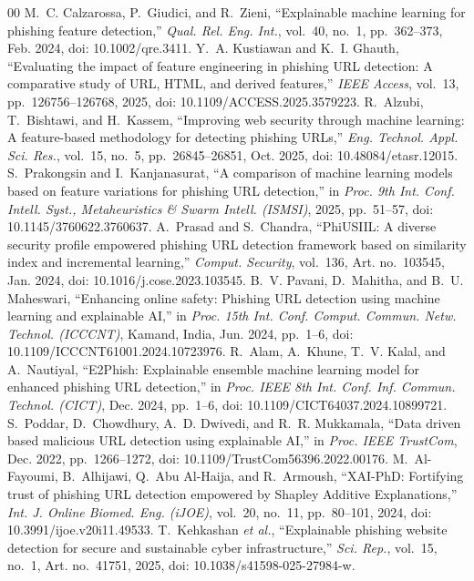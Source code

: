 \documentclass[conference]{IEEEtran}
\begin{document}
\begin{thebibliography}{00}
 M.~C. Calzarossa, P.~Giudici, and R.~Zieni, ``Explainable machine learning for phishing feature detection,'' \textit{Qual. Rel. Eng. Int.}, vol.~40, no.~1, pp.~362--373, Feb. 2024, doi: 10.1002/qre.3411.
 Y.~A. Kustiawan and K.~I. Ghauth, ``Evaluating the impact of feature engineering in phishing URL detection: A comparative study of URL, HTML, and derived features,'' \textit{IEEE Access}, vol.~13, pp.~126756--126768, 2025, doi: 10.1109/ACCESS.2025.3579223.
 R.~Alzubi, T.~Bishtawi, and H.~Kassem, ``Improving web security through machine learning: A feature-based methodology for detecting phishing URLs,'' \textit{Eng. Technol. Appl. Sci. Res.}, vol.~15, no.~5, pp.~26845--26851, Oct. 2025, doi: 10.48084/etasr.12015.
 S.~Prakongsin and I.~Kanjanasurat, ``A comparison of machine learning models based on feature variations for phishing URL detection,'' in \textit{Proc. 9th Int. Conf. Intell. Syst., Metaheuristics \& Swarm Intell. (ISMSI)}, 2025, pp.~51--57, doi: 10.1145/3760622.3760637.
 A.~Prasad and S.~Chandra, ``PhiUSIIL: A diverse security profile empowered phishing URL detection framework based on similarity index and incremental learning,'' \textit{Comput. Security}, vol.~136, Art. no.~103545, Jan. 2024, doi: 10.1016/j.cose.2023.103545.
 B.~V. Pavani, D.~Mahitha, and B.~U. Maheswari, ``Enhancing online safety: Phishing URL detection using machine learning and explainable AI,'' in \textit{Proc. 15th Int. Conf. Comput. Commun. Netw. Technol. (ICCCNT)}, Kamand, India, Jun. 2024, pp.~1--6, doi: 10.1109/ICCCNT61001.2024.10723976.
 R.~Alam, A.~Khune, T.~V. Kalal, and A.~Nautiyal, ``E2Phish: Explainable ensemble machine learning model for enhanced phishing URL detection,'' in \textit{Proc. IEEE 8th Int. Conf. Inf. Commun. Technol. (CICT)}, Dec. 2024, pp.~1--6, doi: 10.1109/CICT64037.2024.10899721.
 S.~Poddar, D.~Chowdhury, A.~D. Dwivedi, and R.~R. Mukkamala, ``Data driven based malicious URL detection using explainable AI,'' in \textit{Proc. IEEE TrustCom}, Dec. 2022, pp.~1266--1272, doi: 10.1109/TrustCom56396.2022.00176.
 M.~Al-Fayoumi, B.~Alhijawi, Q.~Abu Al-Haija, and R.~Armoush, ``XAI-PhD: Fortifying trust of phishing URL detection empowered by Shapley Additive Explanations,'' \textit{Int. J. Online Biomed. Eng. (iJOE)}, vol.~20, no.~11, pp.~80--101, 2024, doi: 10.3991/ijoe.v20i11.49533.
 T.~Kehkashan \textit{et al.}, ``Explainable phishing website detection for secure and sustainable cyber infrastructure,'' \textit{Sci. Rep.}, vol.~15, no.~1, Art. no.~41751, 2025, doi: 10.1038/s41598-025-27984-w.

\end{thebibliography}
\end{document}

